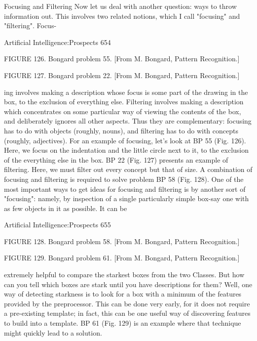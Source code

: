                               Focusing and Filtering
   Now let us deal with another question: ways to throw information out. This
   involves two related notions, which I call "focusing" and "filtering". Focus-




Artificial Intelligence:Prospects                                                      654

   FIGURE 126. Bongard problem 55. [From M. Bongard, Pattern Recognition.]




   FIGURE 127. Bongard problem 22. [From M. Bongard, Pattern Recognition.]

   ing involves making a description whose focus is some part of the drawing in the
   box, to the exclusion of everything else. Filtering involves making a description
   which concentrates on some particular way of viewing the contents of the box, and
   deliberately ignores all other aspects. Thus they are complementary: focusing has
   to do with objects (roughly, nouns), and filtering has to do with concepts (roughly,
   adjectives). For an example of focusing, let's look at BP 55 (Fig. 126). Here, we
   focus on the indentation and the little circle next to it, to the exclusion of the
   everything else in the box. BP 22 (Fig. 127) presents an example of filtering. Here,
   we must filter out every concept but that of size. A combination of focusing and
   filtering is required to solve problem BP 58 (Fig. 128).
   One of the most important ways to get ideas for focusing and filtering is by
   another sort of "focusing": namely, by inspection of a single particularly simple
   box-say one with as few objects in it as possible. It can be




Artificial Intelligence:Prospects                                                     655

   FIGURE 128. Bongard problem 58. [From M. Bongard, Pattern Recognition.]




   FIGURE 129. Bongard problem 61. [From M. Bongard, Pattern Recognition.]

   extremely helpful to compare the starkest boxes from the two Classes. But how
   can you tell which boxes are stark until you have descriptions for them? Well, one
   way of detecting starkness is to look for a box with a minimum of the features
   provided by the preprocessor. This can be done very early, for it does not require a
   pre-existing template; in fact, this can be one useful way of discovering features to
   build into a template. BP 61 (Fig. 129) is an example where that technique might
   quickly lead to a solution.

